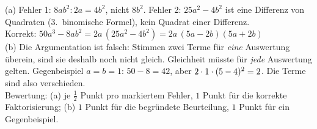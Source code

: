 \documentclass[11pt]{exam}
\begin{document}
\begin{questions}
{\begin{solution}
	(a) Fehler 1: $8ab^2:2a=4b^2$, nicht $8b^2$. Fehler 2: $25a^2-4b^2$ ist eine Differenz von Quadraten (3.\ binomische Formel), kein Quadrat einer Differenz.\\
	Korrekt: $50a^3-8ab^2=2a\,(25a^2-4b^2)=2a\,(5a-2b)(5a+2b)$\\
	(b) Die Argumentation ist falsch: Stimmen zwei Terme für \emph{eine} Auswertung überein, sind sie deshalb noch nicht gleich. Gleichheit müsste für \emph{jede} Auswertung gelten. Gegenbeispiel $a=b=1$: $50-8=42$, aber $2\cdot1\cdot(5-4)^2=2$. Die Terme sind also verschieden.\\
	Bewertung: (a) je $\frac{1}{2}$ Punkt pro markiertem Fehler, $1$ Punkt für die korrekte Faktorisierung; (b) $1$ Punkt für die begründete Beurteilung, $1$ Punkt für ein Gegenbeispiel.
\end{solution}}
{}



\end{questions}
\end{document}

